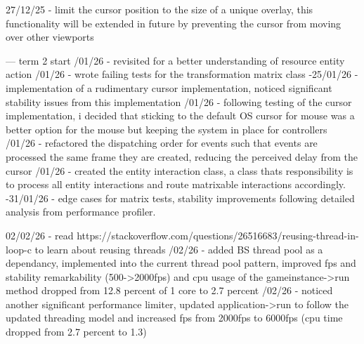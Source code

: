 \documentclass[]{final_report}
\begin{document}
27/12/25 - limit the cursor position to the size of a unique overlay, this functionality will be extended in future by preventing the cursor from moving over other viewports \newline

--- term 2 start /01/26 - revisited  for a better understanding of resource entity action /01/26 - wrote failing tests for the transformation matrix class -25/01/26 - implementation of a rudimentary cursor implementation, noticed significant stability issues from this implementation /01/26 - following testing of the cursor implementation, i decided that sticking to the default OS cursor for mouse was a better option for the mouse but keeping the system in place for controllers /01/26 - refactored the dispatching order for events such that events are processed the same frame they are created, reducing the perceived delay from the cursor /01/26 - created the entity interaction class, a class thats responsibility is to process all entity interactions and route matrixable interactions accordingly. -31/01/26 - edge cases for matrix tests, stability improvements following detailed analysis from performance profiler. \newline

02/02/26 - read https://stackoverflow.com/questions/26516683/reusing-thread-in-loop-c to learn about reusing threads /02/26 - added BS thread pool as a dependancy, implemented into the current thread pool pattern, improved fps and stability remarkability (500->2000fps) and cpu usage of the gameinstance->run method dropped from 12.8 percent of 1 core to 2.7 percent /02/26 - noticed another significant performance limiter, updated application->run to follow the updated threading model and increased fps from 2000fps to 6000fps (cpu time dropped from 2.7 percent to 1.3)\newline
\end{document}
